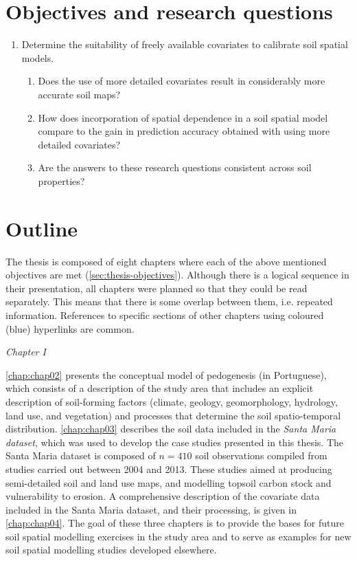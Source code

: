 \section{Objectives and research questions}
\label{sec:thesis-objectives}

\begin{enumerate}
 \item Determine the suitability of freely available covariates to calibrate soil spatial models.

  \begin{enumerate}[label=(\alph*)]
   \item Does the use of more detailed covariates result in considerably more accurate soil maps?
   
   \item How does incorporation of spatial dependence in a soil spatial model compare to the gain in 
   prediction accuracy obtained with using more detailed covariates?
   
   \item Are the answers to these research questions consistent across soil properties?
  \end{enumerate}
\end{enumerate}




\section{Outline}
\label{sec:thesis-outline}

The thesis is composed of eight chapters where each of the above mentioned objectives are met 
(\autoref{sec:thesis-objectives}). Although there is a logical sequence in their presentation, all chapters 
were planned so that they could be read separately. This means that there is some overlap between them, i.e. 
repeated information. References to specific sections of other chapters using coloured (blue) hyperlinks are 
common.

\emph{Chapter I}

\autoref{chap:chap02} presents the conceptual model of pedogenesis (in Portuguese), which consists of a 
description of the study area that includes an explicit description of soil-forming factors (climate, geology, 
geomorphology, hydrology, land use, and vegetation) and processes that determine the soil spatio-temporal 
distribution. \autoref{chap:chap03} describes the soil data included in the \emph{Santa Maria dataset}, which 
was used to develop the case studies presented in this thesis. The Santa Maria dataset is composed of 
$n = 410$ soil observations compiled from studies carried out between \num{2004} and \num{2013}. These studies 
aimed at producing semi-detailed soil and land use maps, and modelling topsoil carbon stock and vulnerability 
to erosion. A comprehensive description of the covariate data included in the Santa Maria dataset, and their 
processing, is given in \autoref{chap:chap04}. The goal of these three chapters is to provide the bases for 
future soil spatial modelling exercises in the study area and to serve as examples for new soil spatial 
modelling studies developed elsewhere.

